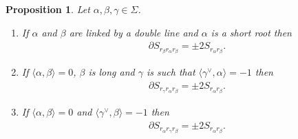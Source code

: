\documentclass[pdftex]{sigma}
\numberwithin{equation}{section}
\newtheorem{Proposition}[Theorem]{Proposition}
 { \theoremstyle{definition}
\newtheorem{Definition}[Theorem]{Definition}
\newtheorem{Note}[Theorem]{Note}
\newtheorem{Example}[Theorem]{Example}
\newtheorem{Remark}[Theorem]{Remark} }
\begin{document}
\begin{Proposition}\label{pro.bound3bab}\label{pro.bound3ort}Let $\alpha,\beta,\gamma \in \Sigma $.
\begin{enumerate}\itemsep=0pt
\item[$1.$] If $\alpha$ and $\beta$ are linked by a double line and $\alpha$ is a short root then
\begin{gather*}
\partial S_{ r_{\beta }r_{\alpha }r_{\beta }} =\pm 2S_{ r_{\alpha }r_{\beta}}.
\end{gather*}
\item[$2.$] If $\langle\alpha,\beta\rangle=0$, $\beta$ is long and $\gamma$ is such that $ \langle \gamma^\vee,\alpha \rangle=-1$ then
\begin{gather*}
\partial S_{ r_{\gamma}r_{\alpha }r_{\beta }} =\pm 2S_{ r_{\alpha }r_{\beta}}.
\end{gather*}
\item[$3.$] If $\langle \alpha,\beta \rangle =0$ and $\langle \gamma ^{\vee},\beta \rangle =-1$ then
\begin{gather*}
\partial S_{ r_{\alpha }r_{\gamma }r_{\beta }} =\pm 2S_{ r_{\alpha }r_{\beta}}.
\end{gather*}
\end{enumerate}
\end{Proposition}
\end{document}

